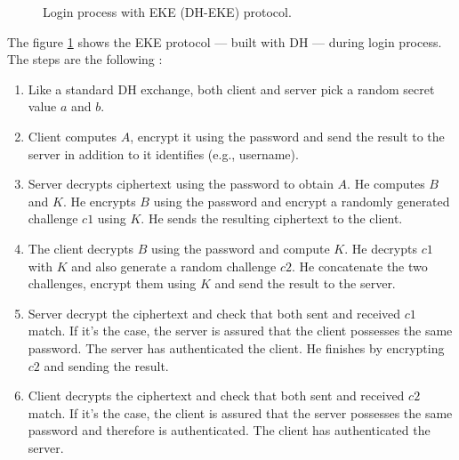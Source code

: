 ﻿\documentclass[../report.tex]{subfiles}
\begin{document}
\begin{figure}[h]
 \centering
 \setlength{\fboxsep}{10pt}
 \setlength{\fboxrule}{1pt}
 \caption{Login process with EKE (DH-EKE) protocol.}
 \label{fig:EKE_DH}
\end{figure}
The figure \ref{fig:EKE_DH} shows the EKE protocol --- built with DH ---  during login process.
The steps are the following :
\begin{enumerate}
 \item Like a standard DH exchange, both client and server pick a random secret value $a$ and $b$.
 \item Client computes $A$, encrypt it using the password and send the result to the server in addition to it identifies (e.g., username).
 \item Server decrypts ciphertext using the password to obtain $A$. He computes $B$ and $K$. He encrypts $B$ using the password and encrypt a randomly generated challenge $c1$ using $K$. He sends the resulting ciphertext to the client.
 \item The client decrypts $B$ using the password and compute $K$. He decrypts $c1$ with $K$ and also generate a random challenge $c2$. He concatenate the two challenges, encrypt them using $K$ and send the result to the server.
 \item Server decrypt the ciphertext and check that both sent and received $c1$ match. If it's the case, the server is assured that the client possesses the same password. The server has authenticated the client. He finishes by encrypting $c2$ and sending the result.
 \item Client decrypts the ciphertext and check that both sent and received $c2$ match. If it's the case, the client is assured that the server possesses the same password and therefore is authenticated. The client has authenticated the server.
\end{enumerate}
\end{document}
